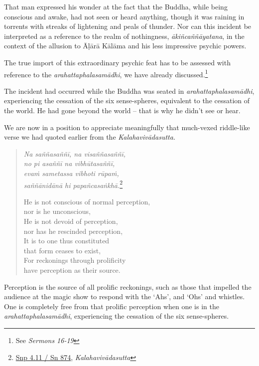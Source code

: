 That man expressed his wonder at the fact that the Buddha, while being conscious and awake, had not seen or heard anything, though it was raining in torrents with streaks of lightening and peals of thunder. Nor can this incident be interpreted as a reference to the realm of nothingness, \emph{ākiñcaññāyatana}, in the context of the allusion to Āḷārā Kālāma and his less impressive psychic powers.

The true import of this extraordinary psychic feat has to be assessed with reference to the \emph{arahattaphalasamādhi}, we have already discussed.\footnote{See \emph{Sermons 16-19}}

The incident had occurred while the Buddha was seated in \emph{arahattaphalasamādhi}, experiencing the cessation of the six sense-spheres, equivalent to the cessation of the world. He had gone beyond the world -- that is why he didn't see or hear.

We are now in a position to appreciate meaningfully that much-vexed riddle-like verse we had quoted earlier from the \emph{Kalahavivādasutta.}

\begin{quote}
\emph{Na saññasaññī, na visaññasaññī,}\\
\emph{no pi asaññī na vibhūtasaññī,}\\
\emph{evaṁ sametassa vibhoti rūpaṁ,}\\
\emph{saññānidānā hi papañcasaṅkhā.}\footnote{\href{https://suttacentral.net/snp4.11/pli/ms}{Snp 4.11 / Sn 874}, \emph{Kalahavivādasutta}}

He is not conscious of normal perception,\\
\vin nor is he unconscious,\\
He is not devoid of perception,\\
\vin nor has he rescinded perception,\\
It is to one thus constituted\\
\vin that form ceases to exist,\\
For reckonings through prolificity\\
\vin have perception as their source.
\end{quote}

Perception is the source of all prolific reckonings, such as those that impelled the audience at the magic show to respond with the `Ahs', and `Ohs' and whistles. One is completely free from that prolific perception when one is in the \emph{arahattaphalasamādhi}, experiencing the cessation of the six sense-spheres.

